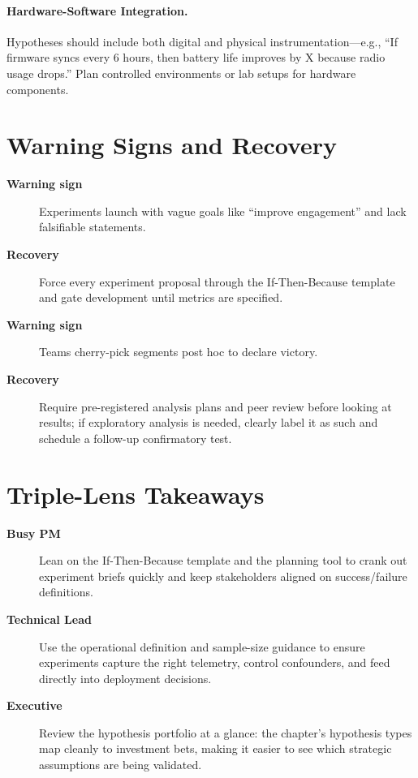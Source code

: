 \paragraph{Hardware-Software Integration.} Hypotheses should include both digital and physical instrumentation—e.g., ``If firmware syncs every 6 hours, then battery life improves by X because radio usage drops.'' Plan controlled environments or lab setups for hardware components.
\section{Warning Signs and Recovery}
\label{sec:hypotheses-warning}
\begin{description}
    \item[\textbf{Warning sign}] Experiments launch with vague goals like ``improve engagement'' and lack falsifiable statements.
    \item[\textbf{Recovery}] Force every experiment proposal through the If-Then-Because template and gate development until metrics are specified.
    \item[\textbf{Warning sign}] Teams cherry-pick segments post hoc to declare victory.
    \item[\textbf{Recovery}] Require pre-registered analysis plans and peer review before looking at results; if exploratory analysis is needed, clearly label it as such and schedule a follow-up confirmatory test.
\end{description}

\section{Triple-Lens Takeaways}
\label{sec:hypotheses-triple}

\begin{description}
    \item[\textbf{Busy PM}] Lean on the If-Then-Because template and the planning tool to crank out experiment briefs quickly and keep stakeholders aligned on success/failure definitions.
    \item[\textbf{Technical Lead}] Use the operational definition and sample-size guidance to ensure experiments capture the right telemetry, control confounders, and feed directly into deployment decisions.
    \item[\textbf{Executive}] Review the hypothesis portfolio at a glance: the chapter’s hypothesis types map cleanly to investment bets, making it easier to see which strategic assumptions are being validated.
\end{description}
